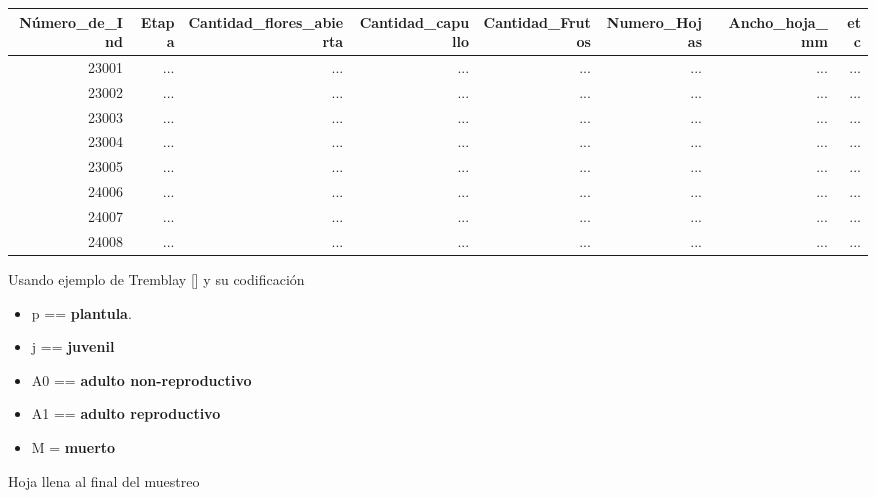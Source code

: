 \documentclass[
]{book}
\providecommand{\tightlist}{%
  \setlength{\itemsep}{0pt}\setlength{\parskip}{0pt}}
\theoremstyle{definition}
\theoremstyle{definition}
\theoremstyle{definition}
\theoremstyle{definition}
\theoremstyle{remark}
\begin{document}
\begin{longtable}{rrrrrrrr}
\toprule
Número\_de\_Ind & Etapa & Cantidad\_flores\_abierta & Cantidad\_capullo & Cantidad\_Frutos & Numero\_Hojas & Ancho\_hoja\_mm & etc \\ 
\midrule
23001 & ... & ... & ... & ... & ... & ... & ... \\ 
23002 & ... & ... & ... & ... & ... & ... & ... \\ 
23003 & ... & ... & ... & ... & ... & ... & ... \\ 
23004 & ... & ... & ... & ... & ... & ... & ... \\ 
23005 & ... & ... & ... & ... & ... & ... & ... \\ 
24006 & ... & ... & ... & ... & ... & ... & ... \\ 
24007 & ... & ... & ... & ... & ... & ... & ... \\ 
24008 & ... & ... & ... & ... & ... & ... & ... \\ 
\bottomrule
\end{longtable}

Usando ejemplo de Tremblay {[}{]} y su codificación

\begin{itemize}
\tightlist
\item
  p == \textbf{plantula}.
\item
  j == \textbf{juvenil}
\item
  A0 == \textbf{adulto non-reproductivo}
\item
  A1 == \textbf{adulto reproductivo}
\item
  M = \textbf{muerto}
\end{itemize}

Hoja llena al final del muestreo
\end{document}
